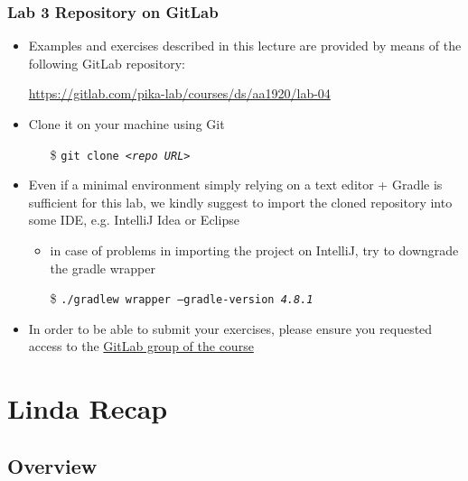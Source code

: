 \documentclass[presentation]{beamer}\mode<presentation>{\usetheme{AMSCesenaPurpleAndGold}}
\begin{document}
\begin{frame}
\frametitle{Lab 3 Repository on GitLab}

	\begin{itemize}
		\item Examples and exercises described in this lecture are provided by means of the following GitLab repository:
		\begin{center}
			\url{https://gitlab.com/pika-lab/courses/ds/aa1920/lab-04}
		\end{center}
		
		\vfill
		
		\item Clone it on your machine using Git
		\begin{itemize}
		    \item[\$] \texttt{git clone \textit{<repo URL>}}
		\end{itemize}
		
		\vfill
		
		\item Even if a minimal environment simply relying on a text editor + Gradle is sufficient for this lab, we kindly suggest to import the cloned repository into some IDE, e.g. IntelliJ Idea or Eclipse
		\begin{itemize}
		    \item in case of problems in importing the project on IntelliJ, try to downgrade the gradle wrapper
		    \item[\$] \texttt{./gradlew wrapper \alert{--gradle-version \textit{4.8.1}}}
		\end{itemize}
		
		\vfill
		
		\item In order to be able to submit your exercises, please ensure you requested access to the \href{https://gitlab.com/pika-lab/courses/ds/aa1920}{GitLab group of the course}
	\end{itemize}

\end{frame}

\section{Linda Recap}

\subsection{Overview} 
\end{document}
